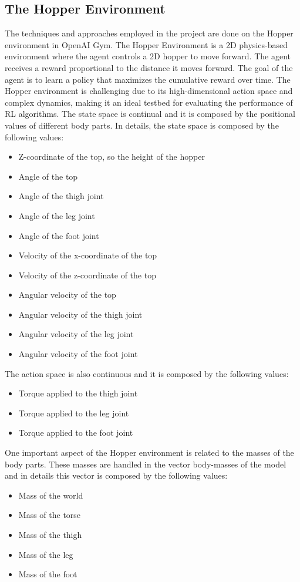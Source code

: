 \documentclass[11pt]{article}
\begin{document}
\subsection{The Hopper Environment}
The techniques and approaches employed in the project are done on the Hopper environment in OpenAI Gym. 
The Hopper Environment is a 2D physics-based environment where the agent controls a 2D hopper to move forward. The agent receives a reward proportional to the distance it moves forward. The goal of the agent is to learn a policy that maximizes the cumulative reward over time. The Hopper environment is challenging due to its high-dimensional action space and complex dynamics, making it an ideal testbed for evaluating the performance of RL algorithms. 
The state space is continual and it is composed by the positional values of different body parts. In details, the state space is composed by the following values:
\begin{itemize}
    \item Z-coordinate of the top, so the height of the hopper
    \item Angle of the top
    \item Angle of the thigh joint
    \item Angle of the leg joint
    \item Angle of the foot joint
    \item Velocity of the x-coordinate of the top
    \item Velocity of the z-coordinate of the top
    \item Angular velocity of the top
    \item Angular velocity of the thigh joint
    \item Angular velocity of the leg joint
    \item Angular velocity of the foot joint
\end{itemize}

The action space is also continuous and it is composed by the following values:
\begin{itemize}
    \item Torque applied to the thigh joint
    \item Torque applied to the leg joint
    \item Torque applied to the foot joint
\end{itemize}

One important aspect of the Hopper environment is related to the masses of the body parts. These masses are handled in the vector body-masses of the model and in details this vector is composed by the following values:
\begin{itemize}
    \item Mass of the world
    \item Mass of the torse
    \item Mass of the thigh
    \item Mass of the leg
    \item Mass of the foot
\end{itemize}
\end{document}
